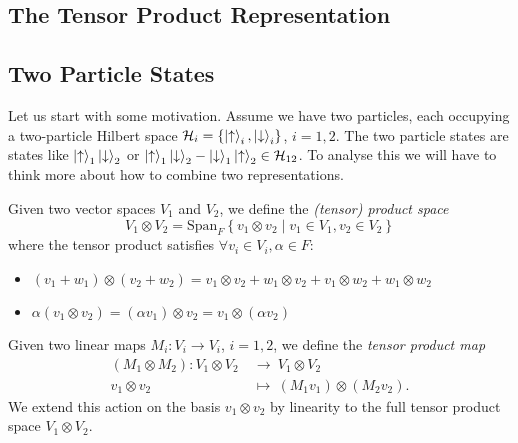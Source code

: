 \subsection{The Tensor Product Representation}%
\label{sub:tensor_product}

\subsection*{Two Particle States}%

Let us start with some motivation.
Assume we have two particles, each occupying a two-particle Hilbert space $\mathcal{H}_i = \left\{ \ket{\uparrow}_i, \ket{\downarrow}_i \right\}$, $i = 1, 2$.
The two particle states are states like $\ket{\uparrow}_1 \ket{\downarrow}_2$ or $\ket{\uparrow}_1 \ket{\downarrow}_2 - \ket{\downarrow}_1 \ket{\uparrow}_2 \in \mathcal{H}_{12}$.
To analyse this we will have to think more about how to combine two representations.

\begin{definition}[]
  Given two vector spaces $V_1$ and $V_2$, we define the \emph{(tensor) product space}
  \begin{equation}
    V_1 \otimes V_2 = \text{Span}_F \left\{ v_1 \otimes v_2 \mid v_1 \in V_1, v_2 \in V_2 \right\}
  \end{equation}
  where the tensor product satisfies $\forall v_i \in V_i, \alpha \in F$:
  \begin{itemize}
    \item $(v_1 + w_1) \otimes (v_2 + w_2) = v_1 \otimes v_2 + w_1 \otimes v_2 + v_1 \otimes w_2 + w_1 \otimes w_2$
    \item $\alpha(v_1 \otimes v_2) = (\alpha v_1) \otimes v_2 = v_1 \otimes (\alpha v_2)$
  \end{itemize}
\end{definition}

\begin{definition}[]
  Given two linear maps $M_i \colon V_i \to V_i$, $i = 1, 2$, we define the \emph{tensor product map}
  \begin{equation}
    \begin{split}
      (M_1 \otimes M_2) \colon V_1 \otimes V_2 \ &\to\  V_1 \otimes V_2 \\
      v_1 \otimes v_2 \ &\mapsto\  (M_1 v_1) \otimes (M_2 v_2).
    \end{split}
  \end{equation}
  We extend this action on the basis $v_1 \otimes v_2$ by linearity to the full tensor product space $V_1 \otimes V_2$.
\end{definition}

